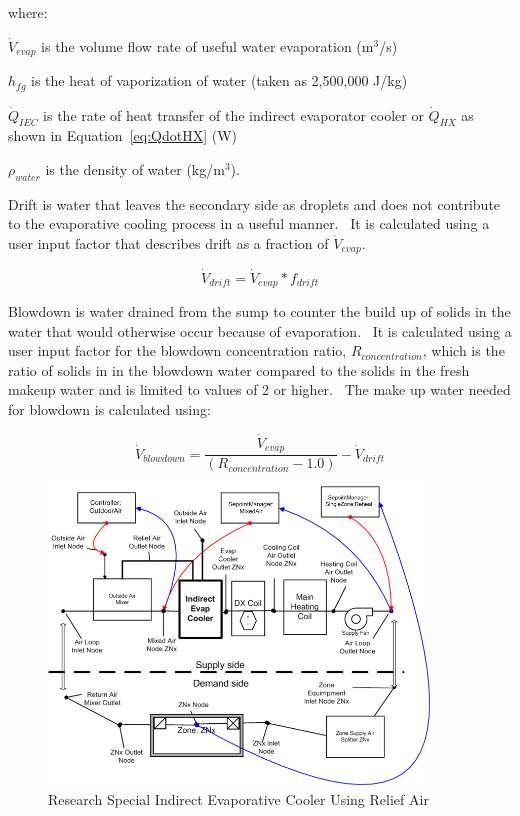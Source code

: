 where:

\({\dot V_{evap}}\) is the volume flow rate of useful water evaporation (m\(^{3}\)/s)

\({h_{fg}}\) is the heat of vaporization of water (taken as 2,500,000 J/kg)

\({\dot Q_{IEC}}\) is the rate of heat transfer of the indirect evaporator cooler or \(\dot{Q}_{HX}\) as shown in Equation~\ref{eq:QdotHX} (W)

\({\rho_{water}}\) is the density of water (kg/m\(^{3}\)).

Drift is water that leaves the secondary side as droplets and does not contribute to the evaporative cooling process in a useful manner.~ It is calculated using a user input factor that describes drift as a fraction of \({\dot V_{evap}}\).

\begin{equation}
{\dot V_{drift}} = {\dot V_{evap}} * {f_{drift}}
\end{equation}

Blowdown is water drained from the sump to counter the build up of solids in the water that would otherwise occur because of evaporation.~ It is calculated using a user input factor for the blowdown concentration ratio, \({R_{concentration}}\), which is the ratio of solids in in the blowdown water compared to the solids in the fresh makeup water and is limited to values of 2 or higher.~ The make up water needed for blowdown is calculated using:

\begin{equation}
{\dot V_{blowdown}} = \frac{{{{\dot V}_{evap}}}}{{\left( {{R_{concentration}} - 1.0} \right)}} - {\dot V_{drift}}
\end{equation}

\begin{figure}[hbtp] %
\centering
\includegraphics[width=0.9\textwidth, height=0.9\textheight, keepaspectratio=true]{media/image4833.png}
\caption{Research Special Indirect Evaporative Cooler Using Relief Air \protect \label{fig:research-special-indirect-evaporative-cooler-001}}
\end{figure}

